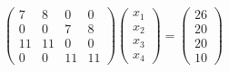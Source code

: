 \begin{math}
\begin{pmatrix}
7 & 8 & 0 & 0 \\ 
0 & 0 & 7 & 8 \\ 
11 & 11 & 0 & 0 \\ 
0 & 0 & 11 & 11
\end{pmatrix}
\begin{pmatrix} x_1 \\x_2 \\x_3 \\x_4 \end{pmatrix}
=
\begin{pmatrix} 26 \\ 20 \\ 20 \\ 10 \end{pmatrix}
\end{math}


